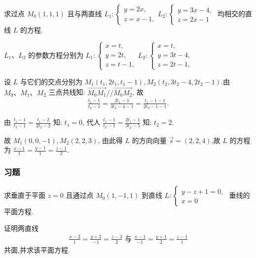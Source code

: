 \begin{example}
	求过点 $M_0(1,1,1)$ 且与两直线 $L_1:\left\{\begin{array}{l}y=2 x, \\ z=x-1,\end{array} L_2:\left\{\begin{array}{l}y=3 x-4, \\ z=2 x-1\end{array}\right.\right.$ 均相交的直线 $L$ 的方程.
\end{example}
\begin{solution}
	$L_1 、 L_2$ 的参数方程分别为 $L_1:\left\{\begin{array}{l}x=t, \\ y=2 t, \\ z=t-1,\end{array} L_2:\left\{\begin{array}{l}x=t, \\ y=3 t-4, \\ z=2 t-1,\end{array}\right.\right.$

	设 $L$ 与它们的交点分别为 $M_1\left(t_1, 2 t_1, t_1-1\right), M_2\left(t_2, 3 t_2-4,2 t_2-1\right)$.由 $M_0 、 M_1 、 M_2$ 三点共线知: $\overrightarrow{M_0 M_1} / / \overrightarrow{M_0 M_2}$, 故
	\begin{align*}
		\frac{t_1-1}{t_2-1}=\frac{2 t_1-1}{3 t_2-4-1}=\frac{t_1-1-1}{2 t_2-1-1} .
	\end{align*}

	由 $\frac{t_1-1}{t_2-1}=\frac{t_1-2}{2 t_2-2}$ 知: $t_1=0$, 代人 $\frac{t_1-1}{t_2-1}=\frac{2 t_1-1}{3 t_2-5}$ 知: $t_2=2$.

	故 $M_1(0,0,-1), M_2(2,2,3)$, 由此得 $L$ 的方向向量 $\vec{s}=(2,2,4)$,故 $L$ 的方程为 $\frac{x-1}{1}=\frac{y-1}{1}=\frac{z-1}{2}$.
\end{solution}

\subsubsection{习题}
\begin{exercise}
	求垂直于平面 $z=0$ 且通过点 $M_0(1,-1,1)$ 到直线 $L:\left\{\begin{array}{l}y-z+1=0, \\ x=0\end{array}\right.$ 垂线的平面方程.
\end{exercise}

\begin{exercise}
	证明两直线
	\begin{align*}
		\frac{x-2}{1}=\frac{y+2}{-1}=\frac{z-3}{2} \text { 与 } \frac{x-1}{-1}=\frac{y+1}{2}=\frac{z-1}{1}
	\end{align*}
	共面,并求该平面方程.
\end{exercise}

